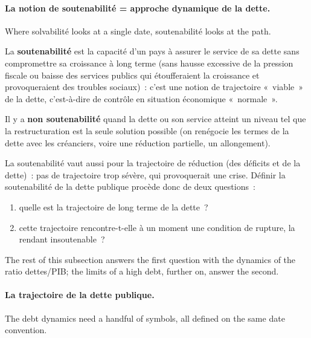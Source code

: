 \paragraph{La notion de soutenabilité = approche dynamique de la dette.}
Where solvabilité looks at a single date, soutenabilité looks at the path.

\begin{definition}
  La \textbf{soutenabilité} est la capacité d'un pays à assurer le service de
  sa dette sans compromettre sa croissance à long terme (sans hausse excessive
  de la pression fiscale ou baisse des services publics qui étoufferaient la
  croissance et provoqueraient des troubles sociaux)~: c'est une notion de
  trajectoire «~viable~» de la dette, c'est-à-dire de contrôle en situation
  économique «~normale~».
\end{definition}

\begin{definition}
  Il y a \textbf{non soutenabilité} quand la dette ou son service atteint un
  niveau tel que la restructuration est la seule solution possible (on
  renégocie les termes de la dette avec les créanciers, voire une réduction
  partielle, un allongement).
\end{definition}

La soutenabilité vaut aussi pour la trajectoire de réduction (des déficits et de
la dette)~: pas de trajectoire trop sévère, qui provoquerait une crise. Définir
la soutenabilité de la dette publique procède donc de deux questions~:
\begin{enumerate}
  \item quelle est la trajectoire de long terme de la dette~?
  \item cette trajectoire rencontre-t-elle à un moment une condition de rupture,
    la rendant insoutenable~?
\end{enumerate}
The rest of this subsection answers the first question with the dynamics of the
ratio dettes/PIB; the limits of a high debt, further on, answer the second.

\paragraph{La trajectoire de la dette publique.}
The debt dynamics need a handful of symbols, all defined on the same date
convention.

